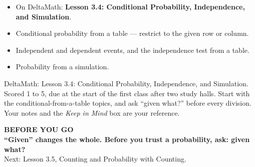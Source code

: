 \documentclass[aspectratio=169, 11pt]{beamer}
\begin{document}
\begin{frame}[t, plain]
  \begin{itemize}\setlength{\itemsep}{5pt}
    \item On DeltaMath: \textbf{Lesson 3.4: Conditional Probability, Independence, and Simulation}.
    \item Conditional probability from a table --- restrict to the given row or column.
    \item Independent and dependent events, and the independence test from a table.
    \item Probability from a simulation.
  \end{itemize}
  \begin{block}{DeltaMath: Lesson 3.4: Conditional Probability, Independence, and Simulation. Scored 1 to 5, due at the start of the first class after two study halls.}
    Start with the conditional-from-a-table topics, and ask ``given what?'' before every division.
    Your notes and the \emph{Keep in Mind} box are your reference.
  \end{block}
\end{frame}

{
\begin{frame}[plain]
  \vspace{1.5cm}\hspace{0.8cm}%
  \begin{minipage}{0.86\textwidth}
    {\color{goldacc}\bfseries\small BEFORE YOU GO}\\[0.7cm]
    {\color{white}\bfseries\Large ``Given'' changes the whole. Before you trust a probability,
    ask: given what?}\\[0.9cm]
    {\color{frostmid}\small Next: Lesson 3.5, Counting and Probability with Counting.}
  \end{minipage}
\end{frame}
}
\end{document}
